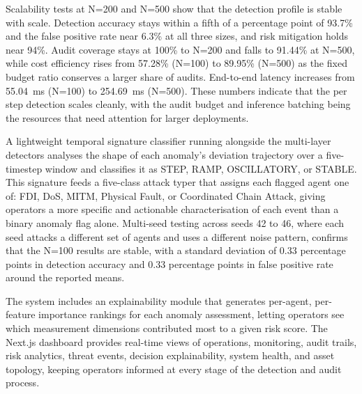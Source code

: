 \par \vspace{0.35cm}

\noindent
Scalability tests at N=200 and N=500 show that the detection profile is stable with scale. Detection accuracy stays within a fifth of a percentage point of 93.7\% and the false positive rate near 6.3\% at all three sizes, and risk mitigation holds near 94\%. Audit coverage stays at 100\% to N=200 and falls to 91.44\% at N=500, while cost efficiency rises from 57.28\% (N=100) to 89.95\% (N=500) as the fixed budget ratio conserves a larger share of audits. End-to-end latency increases from 55.04~ms (N=100) to 254.69~ms (N=500). These numbers indicate that the per step detection scales cleanly, with the audit budget and inference batching being the resources that need attention for larger deployments.

\par \vspace{0.35cm}

\noindent
A lightweight temporal signature classifier running alongside the multi-layer detectors analyses the shape of each anomaly's deviation trajectory over a five-timestep window and classifies it as STEP, RAMP, OSCILLATORY, or STABLE. This signature feeds a five-class attack typer that assigns each flagged agent one of: FDI, DoS, MITM, Physical Fault, or Coordinated Chain Attack, giving operators a more specific and actionable characterisation of each event than a binary anomaly flag alone. Multi-seed testing across seeds 42 to 46, where each seed attacks a different set of agents and uses a different noise pattern, confirms that the N=100 results are stable, with a standard deviation of 0.33 percentage points in detection accuracy and 0.33 percentage points in false positive rate around the reported means.

\par \vspace{0.35cm}

\noindent
The system includes an explainability module that generates per-agent, per-feature importance rankings for each anomaly assessment, letting operators see which measurement dimensions contributed most to a given risk score. The Next.js dashboard provides real-time views of operations, monitoring, audit trails, risk analytics, threat events, decision explainability, system health, and asset topology, keeping operators informed at every stage of the detection and audit process.

\par \vspace{0.35cm}

